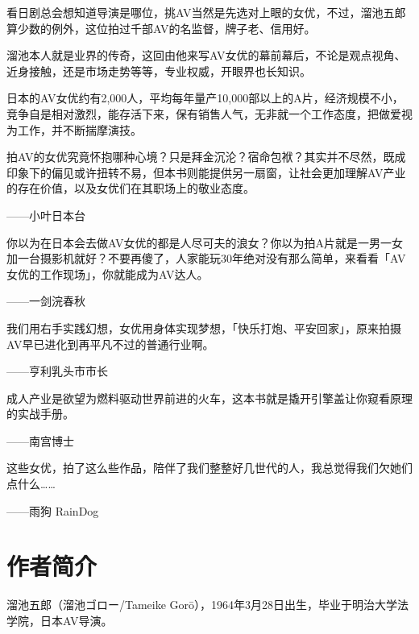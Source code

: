 \documentclass[12pt,UTF8]{ctexbook}
\begin{document}
看日剧总会想知道导演是哪位，挑AV当然是先选对上眼的女优，不过，溜池五郎算少数的例外，这位拍过千部AV的名监督，牌子老、信用好。

溜池本人就是业界的传奇，这回由他来写AV女优的幕前幕后，不论是观点视角、近身接触，还是市场走势等等，专业权威，开眼界也长知识。

日本的AV女优约有2,000人，平均每年量产10,000部以上的A片，经济规模不小，竞争自是相对激烈，能存活下来，保有销售人气，无非就一个工作态度，把做爱视为工作，并不断揣摩演技。

拍AV的女优究竟怀抱哪种心境？只是拜金沉沦？宿命包袱？其实并不尽然，既成印象下的偏见或许扭转不易，但本书则能提供另一扇窗，让社会更加理解AV产业的存在价值，以及女优们在其职场上的敬业态度。

——小叶日本台

你以为在日本会去做AV女优的都是人尽可夫的浪女？你以为拍A片就是一男一女加一台摄影机就好？不要再傻了，人家能玩30年绝对没有那么简单，来看看「AV女优的工作现场」，你就能成为AV达人。

——一剑浣春秋

我们用右手实践幻想，女优用身体实现梦想，「快乐打炮、平安回家」，原来拍摄AV早已进化到再平凡不过的普通行业啊。

——亨利乳头市市长

成人产业是欲望为燃料驱动世界前进的火车，这本书就是撬开引擎盖让你窥看原理的实战手册。

——南宫博士

这些女优，拍了这么些作品，陪伴了我们整整好几世代的人，我总觉得我们欠她们点什么……

——雨狗 RainDog

\chapter{作者简介}

溜池五郎（溜池ゴロー/Tameike Gorō），1964年3月28日出生，毕业于明治大学法学院，日本AV导演。
\end{document}
